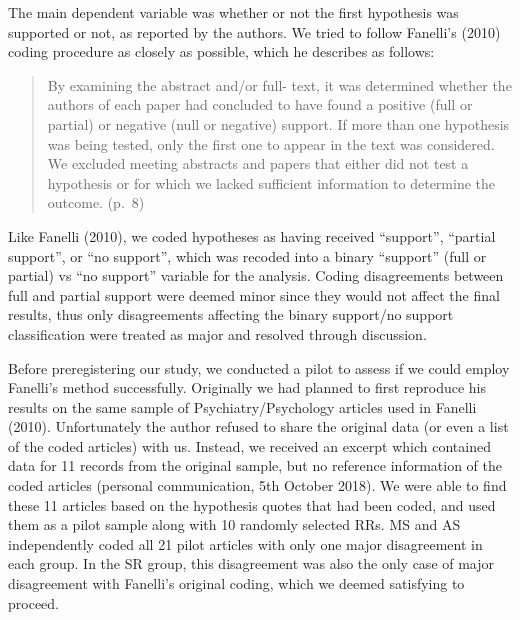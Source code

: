 \documentclass[british,,man,floatsintext]{apa6}
\begin{document}
The main dependent variable was whether or not the first hypothesis was supported or not, as reported by the authors.
We tried to follow Fanelli's (2010) coding procedure as closely as possible, which he describes as follows:

\begin{quote}
By examining the abstract and/or full- text, it was determined whether the authors of each paper had concluded to have found a positive (full or partial) or negative (null or negative) support.
If more than one hypothesis was being tested, only the first one to appear in the text was considered.
We excluded meeting abstracts and papers that either did not test a hypothesis or for which we lacked sufficient information to determine the outcome. (p.~8)
\end{quote}

Like Fanelli (2010), we coded hypotheses as having received \enquote{support}, \enquote{partial support}, or \enquote{no support}, which was recoded into a binary \enquote{support} (full or partial) vs \enquote{no support} variable for the analysis.
Coding disagreements between full and partial support were deemed minor since they would not affect the final results, thus only disagreements affecting the binary support/no support classification were treated as major and resolved through discussion.

Before preregistering our study, we conducted a pilot to assess if we could employ Fanelli's method successfully.
Originally we had planned to first reproduce his results on the same sample of Psychiatry/Psychology articles used in Fanelli (2010).
Unfortunately the author refused to share the original data (or even a list of the coded articles) with us.
Instead, we received an excerpt which contained data for 11 records from the original sample, but no reference information of the coded articles (personal communication, 5th October 2018).
We were able to find these 11 articles based on the hypothesis quotes that had been coded, and used them as a pilot sample along with 10 randomly selected RRs.
MS and AS independently coded all 21 pilot articles with only one major disagreement in each group.
In the SR group, this disagreement was also the only case of major disagreement with Fanelli's original coding, which we deemed satisfying to proceed.
\end{document}
